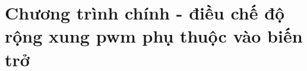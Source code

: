 
\chapter{Chương trình chính - điều chế độ rộng xung pwm phụ thuộc vào biến trở} %

\label{AppendixA} %


%





